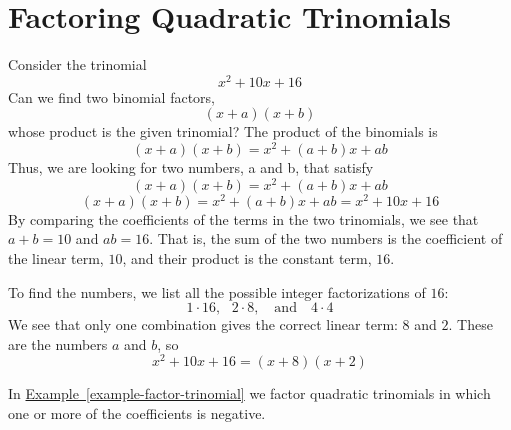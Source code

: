 \documentclass[10pt,]{book}
\theoremstyle{plain}
\theoremstyle{definition}
\theoremstyle{definition}
\theoremstyle{definition}
\numberwithin{equation}{part}
\begin{document}
\section[{Factoring Quadratic Trinomials}]{Factoring Quadratic Trinomials}\label{appendix-Factoring-Quadratic-Trinomials}
Consider the trinomial%
\begin{equation*}
x^2 + 10x + 16
\end{equation*}
Can we find two binomial factors,%
\begin{equation*}
(x + a)(x + b)
\end{equation*}
whose product is the given trinomial? The product of the binomials is%
\begin{equation*}
(x + a)(x + b) = x^2 + (a + b)x + ab
\end{equation*}
Thus, we are looking for two numbers, a and b, that satisfy%
\begin{equation*}
(x + a)(x + b) = x^2 + (a + b)x + ab
\end{equation*}
%
\begin{equation*}
(x + a)(x + b) = x^2 + (a + b)x + ab= x^2 + 10x + 16
\end{equation*}
By comparing the coefficients of the terms in the two trinomials, we see that \(a + b = 10\) and \(ab = 16\). That is, the sum of the two numbers is the coefficient of the linear term, \(10\), and their product is the constant term, \(16\).%
\par
To find the numbers, we list all the possible integer factorizations of \(16\):%
\begin{equation*}
1 \cdot 16, ~~~2 \cdot 8, ~~~\text{ and }~~~ 4 \cdot 4
\end{equation*}
We see that only one combination gives the correct linear term: \(8\) and \(2\). These are the numbers \(a\) and \(b\), so%
\begin{equation*}
x^2 + 10x + 16 = (x + 8)(x + 2)
\end{equation*}
%
\par
In \hyperref[example-factor-trinomial]{Example~\ref{example-factor-trinomial}} we factor quadratic trinomials in which one or more of the coefficients is negative.%
\end{document}
